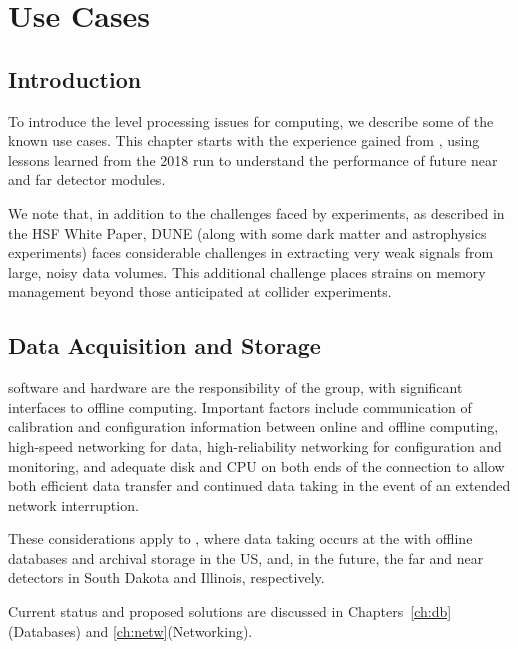 \documentclass[../main-v1.tex]{subfiles}
\begin{document}
\chapter{Use Cases}
\label{ch:use}
\newcommand{\ignore}[1]{{}}



\section{Introduction }

To introduce the  level processing issues for  computing, we describe some of the known use cases.  %
This chapter starts with  the experience gained from  ,  using lessons learned from the 2018 run to understand the performance of future near and far detector modules. 

We note that, in addition to the challenges faced by  experiments, as described in the HSF White Paper\cite{HEPSoftwareFoundation:2017ggl}, DUNE (along with some dark matter and astrophysics experiments) faces considerable challenges in extracting very weak signals from large, noisy data volumes.  This additional challenge places strains on memory management beyond those anticipated at collider experiments. 

\section{Data Acquisition and Storage}

 software and hardware are the responsibility of the  group, with significant interfaces to offline computing. Important factors include communication of calibration and configuration information between online and offline computing, high-speed networking for data, high-reliability networking for configuration and monitoring, and adequate disk and CPU on both ends of the connection to allow both efficient data transfer and continued data taking in the event of an extended network interruption. 

These considerations apply to , where data taking occurs at the  with offline databases and archival storage in the US,  and, in the future, the far and near detectors in South Dakota and Illinois, respectively. 

Current status and proposed solutions are discussed in Chapters~\ref{ch:db}(Databases) and \ref{ch:netw}(Networking). 
\end{document}
